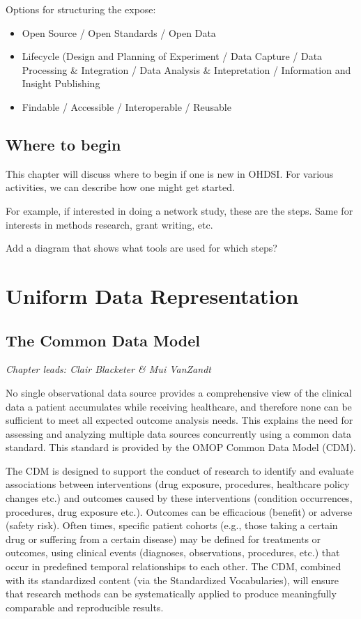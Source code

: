 \documentclass[11pt]{book}
\providecommand{\tightlist}{%
  \setlength{\itemsep}{0pt}\setlength{\parskip}{0pt}}
\begin{document}
Options for structuring the expose:

\begin{itemize}
\tightlist
\item
  Open Source / Open Standards / Open Data
\item
  Lifecycle (Design and Planning of Experiment / Data Capture / Data
  Processing \& Integration / Data Analysis \& Intepretation /
  Information and Insight Publishing
\item
  Findable / Accessible / Interoperable / Reusable
\end{itemize}

\chapter{Where to begin}\label{WhereToBegin}

This chapter will discuss where to begin if one is new in OHDSI. For
various activities, we can describe how one might get started.

For example, if interested in doing a network study, these are the
steps. Same for interests in methods research, grant writing, etc.

Add a diagram that shows what tools are used for which steps?

\part{Uniform Data
Representation}\label{part-uniform-data-representation}

\chapter{The Common Data Model}\label{CommonDataModel}

\emph{Chapter leads: Clair Blacketer \& Mui VanZandt}

No single observational data source provides a comprehensive view of the
clinical data a patient accumulates while receiving healthcare, and
therefore none can be sufficient to meet all expected outcome analysis
needs. This explains the need for assessing and analyzing multiple data
sources concurrently using a common data standard. This standard is
provided by the OMOP Common Data Model (CDM).

The CDM is designed to support the conduct of research to identify and
evaluate associations between interventions (drug exposure, procedures,
healthcare policy changes etc.) and outcomes caused by these
interventions (condition occurrences, procedures, drug exposure etc.).
Outcomes can be efficacious (benefit) or adverse (safety risk). Often
times, specific patient cohorts (e.g., those taking a certain drug or
suffering from a certain disease) may be defined for treatments or
outcomes, using clinical events (diagnoses, observations, procedures,
etc.) that occur in predefined temporal relationships to each other. The
CDM, combined with its standardized content (via the Standardized
Vocabularies), will ensure that research methods can be systematically
applied to produce meaningfully comparable and reproducible results.
\end{document}
